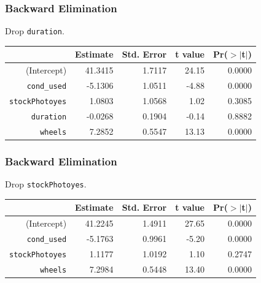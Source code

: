 \documentclass[handout]{beamer}
\newcommand{\blue}[1]{\textcolor{blue2}{#1}}
\begin{document}
\begin{frame}[fragile]
\frametitle{Backward Elimination}
Drop {\tt duration}.

\begin{table}[ht]
\centering
\begin{tabular}{r|rrrr}
  \hline
 & Estimate & Std. Error & t value & Pr($>$$|$t$|$) \\ 
  \hline
(Intercept) & 41.3415 & 1.7117 & 24.15 & 0.0000 \\ 
  {\tt cond\_used} & -5.1306 & 1.0511 & -4.88 & 0.0000 \\ 
  {\tt stockPhotoyes} & 1.0803 & 1.0568 & 1.02 & 0.3085 \\ 
  \blue{{\tt duration}} & \blue{-0.0268} & \blue{0.1904} & \blue{-0.14} & \blue{0.8882} \\ 
  {\tt wheels} & 7.2852 & 0.5547 & 13.13 & 0.0000 \\ 
   \hline
\end{tabular}
\end{table}

\end{frame}


\begin{frame}[fragile]
\frametitle{Backward Elimination}
Drop {\tt stockPhotoyes}.

\begin{table}[ht]
\centering
\begin{tabular}{rrrrr}
  \hline
 & Estimate & Std. Error & t value & Pr($>$$|$t$|$) \\ 
  \hline
(Intercept) & 41.2245 & 1.4911 & 27.65 & 0.0000 \\ 
  {\tt cond\_used} & -5.1763 & 0.9961 & -5.20 & 0.0000 \\ 
  \blue{{\tt stockPhotoyes}} & \blue{1.1177} & \blue{1.0192} & \blue{1.10} & \blue{0.2747} \\ 
  {\tt wheels} & 7.2984 & 0.5448 & 13.40 & 0.0000 \\ 
   \hline
\end{tabular}
\end{table}

\end{frame}
\end{document}
